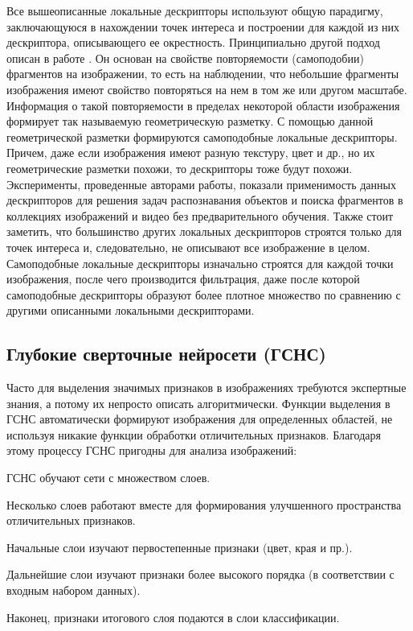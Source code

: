 Все вышеописанные локальные дескрипторы используют общую парадигму,
заключающуюся в нахождении точек интереса и построении для каждой из них
дескриптора, описывающего ее окрестность. Принципиально другой подход описан в
работе \cite{localselfsim}. Он основан на свойстве повторяемости (самоподобии) фрагментов на изображении, то есть на наблюдении, что небольшие фрагменты изображения имеют
свойство повторяться на нем в том же или другом масштабе. Информация о такой
повторяемости в пределах некоторой области изображения формирует так называемую
геометрическую разметку. С помощью данной геометрической разметки формируются
самоподобные локальные дескрипторы. Причем, даже если изображения имеют разную
текстуру, цвет и др., но их геометрические разметки похожи, то дескрипторы тоже будут
похожи. Эксперименты, проведенные авторами работы, показали применимость данных
дескрипторов для решения задач распознавания объектов и поиска фрагментов в
коллекциях изображений и видео без предварительного обучения. Также стоит заметить,
что большинство других локальных дескрипторов строятся только для точек интереса и,
следовательно, не описывают все изображение в целом. Самоподобные локальные
дескрипторы изначально строятся для каждой точки изображения, после чего
производится фильтрация, даже после которой самоподобные дескрипторы образуют
более плотное множество по сравнению с другими описанными локальными
дескрипторами.

\subsection{Глубокие сверточные нейросети (ГСНС)}

Часто для выделения значимых признаков в изображениях требуются экспертные знания, а потому их непросто описать алгоритмически. Функции выделения в ГСНС автоматически формируют изображения для определенных областей, не используя никакие функции обработки отличительных признаков. Благодаря этому процессу ГСНС пригодны для анализа изображений:

ГСНС обучают сети с множеством слоев.
\begin{compactitem}
\item Несколько слоев работают вместе для формирования улучшенного пространства отличительных признаков.
\item Начальные слои изучают первостепенные признаки (цвет, края и пр.).
\item Дальнейшие слои изучают признаки более высокого порядка (в соответствии с входным набором данных).
\item Наконец, признаки итогового слоя подаются в слои классификации.
\end{compactitem}

